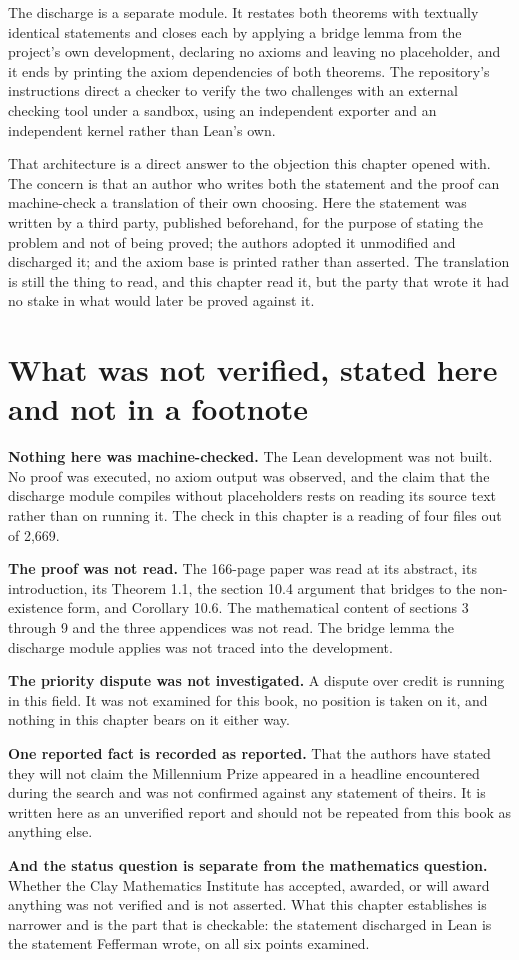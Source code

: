 The discharge is a separate module. It restates both theorems with textually identical statements
and closes each by applying a bridge lemma from the project's own development, declaring no axioms
and leaving no placeholder, and it ends by printing the axiom dependencies of both theorems. The
repository's instructions direct a checker to verify the two challenges with an external checking
tool under a sandbox, using an independent exporter and an independent kernel rather than Lean's
own.

That architecture is a direct answer to the objection this chapter opened with. The concern is that
an author who writes both the statement and the proof can machine-check a translation of their own
choosing. Here the statement was written by a third party, published beforehand, for the purpose of
stating the problem and not of being proved; the authors adopted it unmodified and discharged it;
and the axiom base is printed rather than asserted. The translation is still the thing to read, and
this chapter read it, but the party that wrote it had no stake in what would later be proved
against it.

\section{What was not verified, stated here and not in a footnote}

\textbf{Nothing here was machine-checked.} The Lean development was not built. No proof was
executed, no axiom output was observed, and the claim that the discharge module compiles without
placeholders rests on reading its source text rather than on running it. The check in this chapter
is a reading of four files out of 2{,}669.

\textbf{The proof was not read.} The 166-page paper was read at its abstract, its introduction, its
Theorem 1.1, the section 10.4 argument that bridges to the non-existence form, and Corollary 10.6.
The mathematical content of sections 3 through 9 and the three appendices was not read. The bridge
lemma the discharge module applies was not traced into the development.

\textbf{The priority dispute was not investigated.} A dispute over credit is running in this field.
It was not examined for this book, no position is taken on it, and nothing in this chapter bears on
it either way.

\textbf{One reported fact is recorded as reported.} That the authors have stated they will not claim
the Millennium Prize appeared in a headline encountered during the search and was not confirmed
against any statement of theirs. It is written here as an unverified report and should not be
repeated from this book as anything else.

\textbf{And the status question is separate from the mathematics question.} Whether the Clay
Mathematics Institute has accepted, awarded, or will award anything was not verified and is not
asserted. What this chapter establishes is narrower and is the part that is checkable: the
statement discharged in Lean is the statement Fefferman wrote, on all six points examined.
